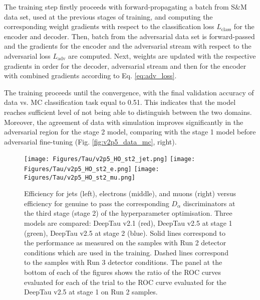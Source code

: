 The training step firstly proceeds with forward-propagating a batch from S\&M data set, used at the previous stages of training, and computing the corresponding weight gradients with respect to the classification loss $L_\text{class}$ for the encoder and decoder. Then, batch from the adversarial data set is forward-passed and the gradients for the encoder and the adversarial stream with respect to the adversarial loss $L_\text{adv}$ are computed. Next, weights are updated with the respective gradients in order for the decoder, adversarial stream and then for the encoder with combined gradients according to Eq. \ref{eq:adv_loss}. 

The training proceeds until the convergence, with the final validation accuracy of data vs. MC classification task equal to 0.51. This indicates that the model reaches sufficient level of not being able to distinguish between the two domains. Moreover, the agreement of data with simulation improves significantly in the adversarial region for the stage 2 model, comparing with the stage 1 model before adversarial fine-tuning (Fig. \ref{fig:v2p5_data_mc}, right). 

\begin{figure}[t!]
    \centering
    \texttt{[image: Figures/Tau/v2p5\_HO\_st2\_jet.png]}
    \texttt{[image: Figures/Tau/v2p5\_HO\_st2\_e.png]}
    \texttt{[image: Figures/Tau/v2p5\_HO\_st2\_mu.png]}
    \caption{Efficiency for jets (left), electrons (middle), and muons (right) versus efficiency for genuine \tauh to pass the corresponding $D_\alpha$ discriminators at the third stage (stage 2) of the hyperparameter optimisation. Three models are compared: DeepTau v2.1 (red), DeepTau v2.5 at stage 1 (green), DeepTau v2.5 at stage 2 (blue). Solid lines correspond to the performance as measured on the samples with Run 2 detector conditions which are used in the training. Dashed lines correspond to the samples with Run 3 detector conditions. The panel at the bottom of each of the figures shows the ratio of the ROC curves evaluated for each of the trial to the ROC curve evaluated for the DeepTau v2.5 at stage 1 on Run 2 samples.}
    \label{fig:v2p5_HO_stage2_performance}
\end{figure}

